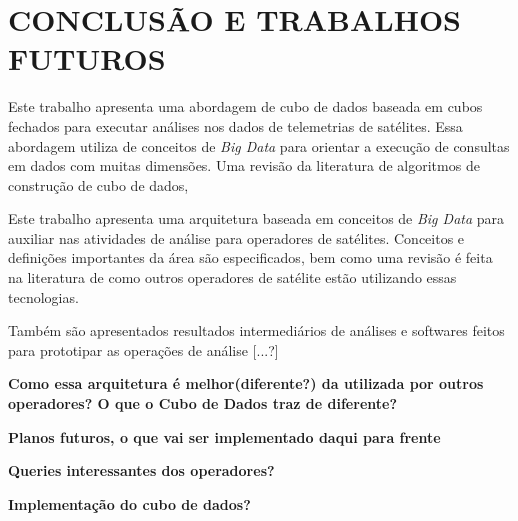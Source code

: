 
\chapter{CONCLUSÃO E TRABALHOS FUTUROS}

Este trabalho apresenta uma abordagem de cubo de dados baseada em cubos fechados para executar análises nos dados de telemetrias de satélites. Essa abordagem utiliza de conceitos de \textit{Big Data} para orientar a execução de consultas em dados com muitas dimensões. Uma revisão da literatura de algoritmos de construção de cubo de dados, 

Este trabalho apresenta uma arquitetura baseada em conceitos de \textit{Big Data} para auxiliar nas atividades de análise para operadores de satélites. Conceitos e definições importantes da área são especificados, bem como uma revisão é feita na literatura de como outros operadores de satélite estão utilizando essas tecnologias.

Também são apresentados resultados intermediários de análises e softwares feitos para prototipar as operações de análise [...?]

\textbf{Como essa arquitetura é melhor(diferente?) da utilizada por outros operadores? O que o Cubo de Dados traz de diferente?}

\textbf{Planos futuros, o que vai ser implementado daqui para frente}

\textbf{Queries interessantes dos operadores?}

\textbf{Implementação do cubo de dados?}

